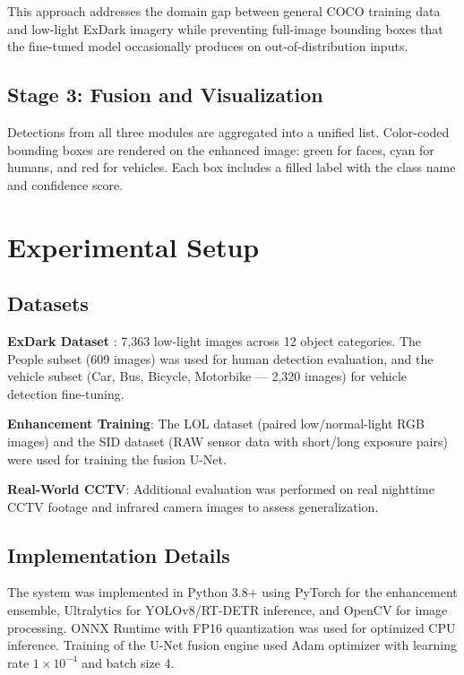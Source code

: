 \documentclass[conference]{IEEEtran}
\begin{document}
This approach addresses the domain gap between general COCO training data and low-light ExDark imagery while preventing full-image bounding boxes that the fine-tuned model occasionally produces on out-of-distribution inputs.

\subsection{Stage 3: Fusion and Visualization}

Detections from all three modules are aggregated into a unified list. Color-coded bounding boxes are rendered on the enhanced image: green for faces, cyan for humans, and red for vehicles. Each box includes a filled label with the class name and confidence score.

\section{Experimental Setup}

\subsection{Datasets}

\textbf{ExDark Dataset} \cite{b5}: 7,363 low-light images across 12 object categories. The People subset (609 images) was used for human detection evaluation, and the vehicle subset (Car, Bus, Bicycle, Motorbike --- 2,320 images) for vehicle detection fine-tuning.

\textbf{Enhancement Training}: The LOL dataset (paired low/normal-light RGB images) and the SID dataset (RAW sensor data with short/long exposure pairs) were used for training the fusion U-Net.

\textbf{Real-World CCTV}: Additional evaluation was performed on real nighttime CCTV footage and infrared camera images to assess generalization.

\subsection{Implementation Details}

The system was implemented in Python 3.8+ using PyTorch for the enhancement ensemble, Ultralytics for YOLOv8/RT-DETR inference, and OpenCV for image processing. ONNX Runtime with FP16 quantization was used for optimized CPU inference. Training of the U-Net fusion engine used Adam optimizer with learning rate $1 \times 10^{-4}$ and batch size 4.
\end{document}
